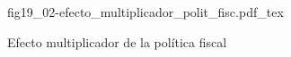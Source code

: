 \begin{figure}[h]
\centering
\def\svgwidth{0.5\textwidth}
{fig19_02-efecto_multiplicador_polit_fisc.pdf_tex}
\caption{Efecto multiplicador de la política fiscal}
\label{fig19_02-efecto_multiplicador_polit_fisc}
\end{figure}